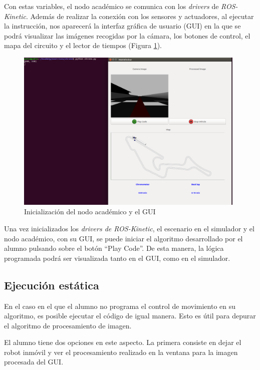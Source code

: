 Con estas variables, el nodo académico se comunica con los \textit{drivers} de \textit{ROS-Kinetic}.
Además de realizar la conexión con los sensores y actuadores, al ejecutar la instrucción, nos aparecerá la interfaz gráfica de usuario (GUI) en la que se podrá visualizar las imágenes recogidas por la cámara, los botones de control, el mapa del circuito y el lector de tiempos (Figura \ref{fig.inaGch}).

\begin{figure}[H]
  \begin{center}
    \includegraphics[width=0.98\textwidth]{figures/init_na_chrono.png}
		\caption{Inicialización del nodo académico y el GUI}
		\label{fig.inaGch}
		\end{center}
\end{figure}

Una vez inicializados los \textit{drivers de ROS-Kinetic}, el escenario en el simulador y el nodo académico, con su GUI, se puede iniciar el algoritmo desarrollado por el alumno pulsando sobre el botón ``Play Code''. De esta manera, la lógica programada podrá ser visualizada tanto en el GUI, como en el simulador.
 
\subsection{Ejecución estática}
En el caso en el que el alumno no programa el control de movimiento en su algoritmo, es posible ejecutar el código de igual manera. Esto es útil para depurar el algoritmo de procesamiento de imagen. 

El alumno tiene dos opciones en este aspecto. La primera consiste en dejar el robot inmóvil y ver el procesamiento realizado en la ventana para la imagen procesada del GUI. 

